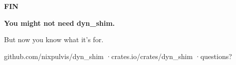 \documentclass[aspectratio=169,11pt,t]{beamer}
\newcommand{\eyebrow}[2][steel]{{\ttfamily\scriptsize\bfseries\color{#1}\MakeUppercase{#2}}\par\vspace{0.4em}}
\newcommand{\dnote}[1]{{\ttfamily\scriptsize\color{dim}#1\par}}
\newcommand{\ox}[1]{{\color{oxide}#1}}
\begin{document}
{
\begin{frame}[plain,c]
\vfill
\begin{center}
\eyebrow[dim]{Fin}
\vspace{0.6em}

{\fontsize{40}{46}\selectfont\bfseries\color{text}You might not need \ox{dyn\_shim}.}
\vspace{1em}

{\Large\color{muted}But now you know what it's for.}
\end{center}
\vfill
\dnote{\color{muted}github.com/nixpulvis/dyn\_shim \quad·\quad crates.io/crates/dyn\_shim \quad·\quad questions?}
\end{frame}
}
\end{document}
